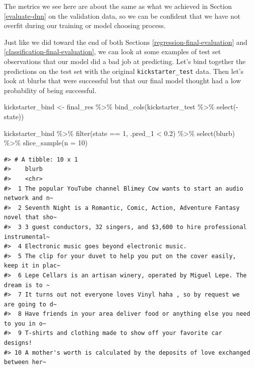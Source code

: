 \documentclass[
]{krantz}
\makeatletter
\newenvironment{Shaded}{\begin{snugshade}}{\end{snugshade}}
\newcommand{\AttributeTok}[1]{\textcolor[rgb]{0.77,0.63,0.00}{#1}}
\newcommand{\DecValTok}[1]{\textcolor[rgb]{0.00,0.00,0.81}{#1}}
\newcommand{\FloatTok}[1]{\textcolor[rgb]{0.00,0.00,0.81}{#1}}
\newcommand{\FunctionTok}[1]{\textcolor[rgb]{0.00,0.00,0.00}{#1}}
\newcommand{\NormalTok}[1]{#1}
\newcommand{\OtherTok}[1]{\textcolor[rgb]{0.56,0.35,0.01}{#1}}
\newcommand{\SpecialCharTok}[1]{\textcolor[rgb]{0.00,0.00,0.00}{#1}}
\newenvironment{kframe}{%
\medskip{}
\setlength{\fboxsep}{.8em}
 \def\at@end@of@kframe{}%
 \ifinner\ifhmode%
  \def\at@end@of@kframe{\end{minipage}}%
  \begin{minipage}{\columnwidth}%
 \fi\fi%
 \def\FrameCommand##1{\hskip\@totalleftmargin \hskip-\fboxsep
 \colorbox{shadecolor}{##1}\hskip-\fboxsep
     \hskip-\linewidth \hskip-\@totalleftmargin \hskip\columnwidth}%
 \MakeFramed {\advance\hsize-\width
   \@totalleftmargin\z@ \linewidth\hsize
   \@setminipage}}%
 {\par\unskip\endMakeFramed%
 \at@end@of@kframe}
\renewenvironment{Shaded}{\begin{kframe}}{\end{kframe}}
\makeatother
\begin{document}
The metrics we see here are about the same as what we achieved in Section \ref{evaluate-dnn} on the validation data, so we can be confident that we have not overfit during our training or model choosing process.

Just like we did toward the end of both Sections \ref{regression-final-evaluation} and \ref{classification-final-evaluation}, we can look at some examples of test set observations that our model did a bad job at predicting. Let's bind together the predictions on the test set with the original \texttt{kickstarter\_test} data. Then let's look at blurbs that were successful but that our final model thought had a low probability of being successful.

\begin{Shaded}
\begin{Highlighting}[]
\NormalTok{kickstarter\_bind }\OtherTok{\textless{}{-}}\NormalTok{ final\_res }\SpecialCharTok{\%\textgreater{}\%}
  \FunctionTok{bind\_cols}\NormalTok{(kickstarter\_test }\SpecialCharTok{\%\textgreater{}\%} \FunctionTok{select}\NormalTok{(}\SpecialCharTok{{-}}\NormalTok{state))}

\NormalTok{kickstarter\_bind }\SpecialCharTok{\%\textgreater{}\%}
  \FunctionTok{filter}\NormalTok{(state }\SpecialCharTok{==} \DecValTok{1}\NormalTok{, .pred\_1 }\SpecialCharTok{\textless{}} \FloatTok{0.2}\NormalTok{) }\SpecialCharTok{\%\textgreater{}\%}
  \FunctionTok{select}\NormalTok{(blurb) }\SpecialCharTok{\%\textgreater{}\%}
  \FunctionTok{slice\_sample}\NormalTok{(}\AttributeTok{n =} \DecValTok{10}\NormalTok{)}
\end{Highlighting}
\end{Shaded}

\begin{verbatim}
#> # A tibble: 10 x 1
#>    blurb                                                                        
#>    <chr>                                                                        
#>  1 The popular YouTube channel Blimey Cow wants to start an audio network and n~
#>  2 Seventh Night is a Romantic, Comic, Action, Adventure Fantasy novel that sho~
#>  3 3 guest conductors, 32 singers, and $3,600 to hire professional instrumental~
#>  4 Electronic music goes beyond electronic music.                               
#>  5 The clip for your duvet to help you put on the cover easily, keep it in plac~
#>  6 Lepe Cellars is an artisan winery, operated by Miguel Lepe. The dream is to ~
#>  7 It turns out not everyone loves Vinyl haha , so by request we are going to d~
#>  8 Have friends in your area deliver food or anything else you need to you in o~
#>  9 T-shirts and clothing made to show off your favorite car designs!            
#> 10 A mother's worth is calculated by the deposits of love exchanged between her~
\end{verbatim}
\end{document}
